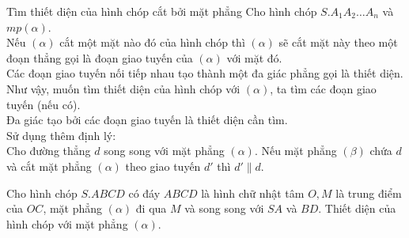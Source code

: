 \begin{dang}{Tìm thiết diện của hình chóp cắt bởi mặt phẳng}
	Cho hình chóp $S.A_1A_2\ldots A_n$ và $mp(\alpha)$.\\
	Nếu $(\alpha)$ cắt một mặt nào đó của hình chóp thì $(\alpha)$ sẽ cắt mặt này theo một đoạn thẳng gọi là đoạn giao tuyến của $(\alpha)$ với mặt đó.\\
	Các đoạn giao tuyến nối tiếp nhau tạo thành một đa giác phẳng gọi là thiết diện.\\
	Như vậy, muốn  tìm thiết diện của hình chóp với $(\alpha)$, ta tìm các đoạn giao tuyến (nếu có). \\
	Đa giác tạo bởi các đoạn giao tuyến là thiết diện cần tìm.\\
	Sử dụng thêm định lý:\\
	Cho đường thẳng $d$ song song với mặt phẳng $(\alpha)$. Nếu mặt phẳng $(\beta)$ chứa $d$ và cắt mặt phẳng $(\alpha)$ theo giao tuyến $d'$ thì $d'\parallel d$.
\end{dang}

\begin{vd}%
	Cho hình chóp $S.ABCD$ có đáy $ABCD$ là hình chữ nhật tâm $O, M$ là trung điểm của $OC$, mặt phẳng $(\alpha)$ đi qua $M$ và song song với $SA$ và $BD$. Thiết diện của hình chóp với mặt phẳng $(\alpha)$.
\end{vd}

